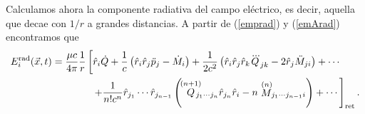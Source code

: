 Calculamos ahora la componente radiativa del campo eléctrico, es decir, aquella que decae con $1/r$ a grandes distancias. A partir de (\ref{emprad}) y (\ref{emArad}) encontramos que
\begin{align}
E_i^{\rm rad}(\vec{x},t) &= \frac{\mu c}{4\pi}\frac{1}{r}\left[\hat{r}_i\dot{Q}+\frac{1}{c}\left(\hat{r}_i\hat{r}_j\ddot{p}_j-\dot{M}_i\right)+\frac{1}{2c^2}\left(\hat{r}_i\hat{r}_j\hat{r}_k\dddot{Q}_{jk} -2\hat{r}_j\ddot{M}_{ji}\right)+\cdots\right.\nonumber\\
& \qquad\qquad \left.+\frac{1}{n!c^n}\hat{r}_{j_1}\cdots\hat{r}_{j_{n-1}}\left(\!\stackrel{(n+1)}{Q}\!\!\!\!\!{}_{j_1\cdots j_n}\hat{r}_{j_n}\hat{r}_i- n\stackrel{(n)}{M}\!\!{}_{j_1\cdots j_{n-1}i}\right)+\cdots\right]_{\rm ret}. \label{emErad}
\end{align}


